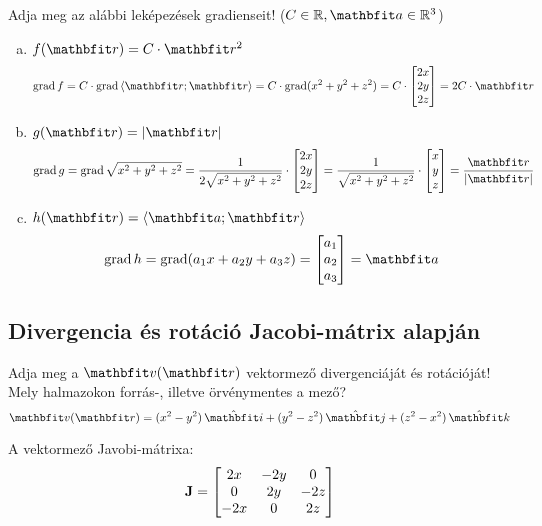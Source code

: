 \documentclass{szb-solution}
\begin{document}
Adja meg az alábbi leképezések gradienseit!
($C \in \Reals, \rvec a \in \Reals^3$)
\begin{enumerate}[a)]
  \item $f (\coordvec) = C \cdot \coordvec^2$
        $$
          \grad f
          = C \cdot \grad \scalar{\coordvec}{\coordvec}
          = C \cdot \grad (x^2 + y^2 + z^2)
          = C \cdot \begin{bmatrix}
            2x \\ 2y \\ 2z
          \end{bmatrix}
          = 2C \cdot \coordvec
        $$

  \item $g (\coordvec) = |\coordvec|$
        $$
          \grad g
          = \grad \sqrt{x^2 + y^2 + z^2}
          = \frac{1}{2\sqrt{x^2 + y^2 + z^2}} \cdot \begin{bmatrix}
            2x \\ 2y \\ 2z
          \end{bmatrix} = \frac{1}{\sqrt{x^2 + y^2 + z^2}} \cdot \begin{bmatrix}
            x \\ y \\ z
          \end{bmatrix} = \frac{\coordvec}{|\coordvec|}
        $$

  \item $h (\coordvec) = \scalar{\rvec a}{\coordvec}$
        $$
          \grad h
          = \grad (a_1 x + a_2 y + a_3 z)
          = \begin{bmatrix}
            a_1 \\ a_2 \\ a_3
          \end{bmatrix}
          = \rvec a
        $$
\end{enumerate}

\subsection{Divergencia és rotáció Jacobi-mátrix alapján}

Adja meg a $\rvec v (\coordvec)$ vektormező divergenciáját és rotációját!
Mely halmazokon forrás-, illetve örvénymentes a mező?
$$
  \rvec v(\coordvec) = \ijk{x^2 - y^2}{y^2 - z^2}{z^2 - x^2}
$$

A vektormező Javobi-mátrixa:
$$
  \mathbf{J} = \begin{bmatrix}
    2x  & -2y & 0   \\
    0   & 2y  & -2z \\
    -2x & 0   & 2z
  \end{bmatrix}
$$
\end{document}
